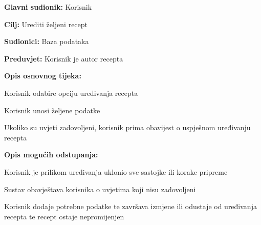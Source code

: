 \noindent {}
\begin{packed_item}

	\item \textbf{Glavni sudionik: } Korisnik
	\item  \textbf{Cilj:} Urediti željeni recept
	\item  \textbf{Sudionici:} Baza podataka
	\item  \textbf{Preduvjet:} Korisnik je autor recepta
	\item  \textbf{Opis osnovnog tijeka:}

	\item[] \begin{packed_enum}

		\item Korisnik odabire opciju uređivanja recepta
		\item Korisnik unosi željene podatke
		\item Ukoliko su uvjeti zadovoljeni, korisnik prima obavijest o uspješnom uređivanju recepta
	\end{packed_enum}

	\item  \textbf{Opis mogućih odstupanja:}

	\item[] \begin{packed_item}

		\item[2.a] Korisnik je prilikom uređivanja uklonio sve sastojke ili korake pripreme

		\item[] \begin{packed_enum}

			\item Sustav obavještava korisnika o uvjetima koji nisu zadovoljeni
			\item Korisnik dodaje potrebne podatke te završava izmjene ili odustaje od uređivanja recepta te recept ostaje nepromijenjen

		\end{packed_enum}

	\end{packed_item}
\end{packed_item}

